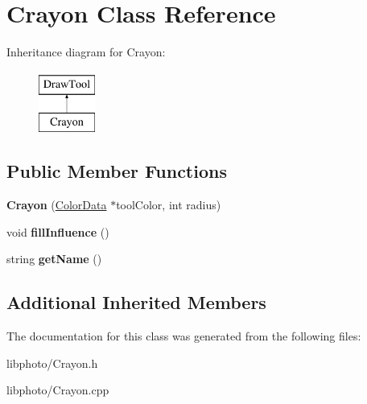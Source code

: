 \hypertarget{classCrayon}{\section{Crayon Class Reference}
\label{classCrayon}
}
Inheritance diagram for Crayon\-:\begin{figure}[H]
\begin{center}
\leavevmode
\includegraphics[height=2.000000cm]{classCrayon}
\end{center}
\end{figure}
\subsection*{Public Member Functions}
\begin{DoxyCompactItemize}
\item 
\hypertarget{classCrayon_a705e3468d3ede98a95f792bfd05be7dd}{{\bfseries Crayon} (\hyperlink{classColorData}{Color\-Data} $\ast$tool\-Color, int radius)}\label{classCrayon_a705e3468d3ede98a95f792bfd05be7dd}

\item 
\hypertarget{classCrayon_a2af3bd14c6bc719a252a9c9f1c5eccb7}{void {\bfseries fill\-Influence} ()}\label{classCrayon_a2af3bd14c6bc719a252a9c9f1c5eccb7}

\item 
\hypertarget{classCrayon_a0484aec2b5ac3d6147e4e0bf8b3aa9d4}{string {\bfseries get\-Name} ()}\label{classCrayon_a0484aec2b5ac3d6147e4e0bf8b3aa9d4}

\end{DoxyCompactItemize}
\subsection*{Additional Inherited Members}


The documentation for this class was generated from the following files\-:\begin{DoxyCompactItemize}
\item 
libphoto/Crayon.\-h\item 
libphoto/Crayon.\-cpp\end{DoxyCompactItemize}
